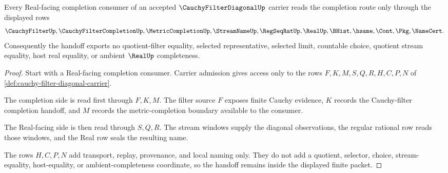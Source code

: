 \begin{theorem}
\label{thm:cauchy-filter-diagonal-real-completion-handoff}
Every Real-facing completion consumer of an accepted $\CauchyFilterDiagonalUp$ carrier reads the completion route only through the displayed rows
$$
\CauchyFilterUp,\CauchyFilterCompletionUp,\MetricCompletionUp,\StreamNameUp,\RegSeqRatUp,\RealUp,\BHist,\hsame,\Cont,\Pkg,\NameCert .
$$
Consequently the handoff exports no quotient-filter equality, selected representative, selected limit, countable choice, quotient stream equality, host real equality, or ambient $\RealUp$ completeness.
\end{theorem}
\begin{proof}
Start with a Real-facing completion consumer. Carrier admission gives access only to the rows $F,K,M,S,Q,R,H,C,P,N$ of \autoref{def:cauchy-filter-diagonal-carrier}.

The completion side is read first through $F,K,M$. The filter source $F$ exposes finite Cauchy evidence, $K$ records the Cauchy-filter completion handoff, and $M$ records the metric-completion boundary available to the consumer.

The Real-facing side is then read through $S,Q,R$. The stream windows supply the diagonal observations, the regular rational row reads those windows, and the Real row seals the resulting name.

The rows $H,C,P,N$ add transport, replay, provenance, and local naming only. They do not add a quotient, selector, choice, stream-equality, host-equality, or ambient-completeness coordinate, so the handoff remains inside the displayed finite packet.
\end{proof}


\begin{closurestatus}{\CauchyFilterDiagonalUp}
  \theoryclosure{\seedClosure}
  \formalstatus{\unformalizedV}
\end{closurestatus}
